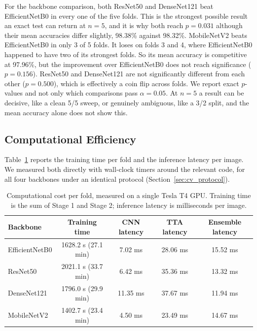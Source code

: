 \documentclass[11pt]{article}
\begin{document}
For the backbone comparison, both ResNet50 and DenseNet121 beat EfficientNetB0 in every one of the five folds. This is the strongest possible result an exact test can return at $n=5$, and it is why both reach $p=0.031$ although their mean accuracies differ slightly, 98.38\% against 98.32\%. MobileNetV2 beats EfficientNetB0 in only 3 of 5 folds. It loses on folds 3 and 4, where EfficientNetB0 happened to have two of its strongest folds. So its mean accuracy is competitive at 97.96\%, but the improvement over EfficientNetB0 does not reach significance ($p=0.156$). ResNet50 and DenseNet121 are not significantly different from each other ($p=0.500$), which is effectively a coin flip across folds. We report exact $p$-values and not only which comparisons pass $\alpha=0.05$. At $n=5$ a result can be decisive, like a clean 5/5 sweep, or genuinely ambiguous, like a 3/2 split, and the mean accuracy alone does not show this.

\subsection{Computational Efficiency}
\label{sec:efficiency}

Table~\ref{tab:efficiency} reports the training time per fold and the inference latency per image. We measured both directly with wall-clock timers around the relevant code, for all four backbones under an identical protocol (Section~\ref{sec:cv_protocol}).

\begin{table}[htbp]
\centering
\caption{Computational cost per fold, measured on a single Tesla T4 GPU. Training time is the sum of Stage 1 and Stage 2; inference latency is milliseconds per image.}
\label{tab:efficiency}
\small
\begin{tabular*}{\textwidth}{@{\extracolsep{\fill}}lcccc@{}}
\toprule
\textbf{Backbone} & \textbf{Training time} & \textbf{CNN latency} & \textbf{TTA latency} & \textbf{Ensemble latency} \\
\midrule
EfficientNetB0 & 1628.2 s (27.1 min) & 7.02 ms & 28.06 ms & 15.52 ms \\
ResNet50     & 2021.1 s (33.7 min) & 6.42 ms & 35.36 ms & 13.32 ms \\
DenseNet121  & 1796.0 s (29.9 min) & 11.35 ms & 37.67 ms & 11.94 ms \\
MobileNetV2  & 1402.7 s (23.4 min) & 4.50 ms & 23.49 ms & 14.67 ms \\
\bottomrule
\end{tabular*}
\end{table}
\end{document}
